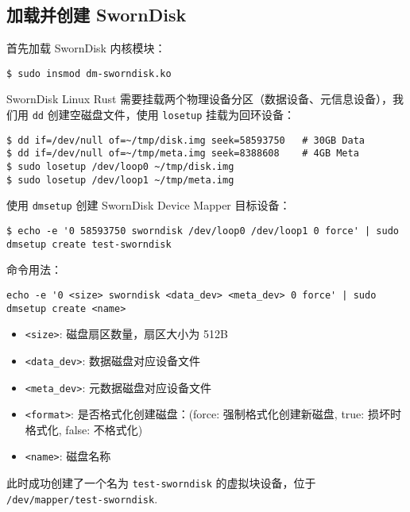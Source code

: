 \subsection{加载并创建 SwornDisk}

首先加载 SwornDisk 内核模块：

\begin{verbatim}
$ sudo insmod dm-sworndisk.ko
\end{verbatim}

SwornDisk Linux Rust 需要挂载两个物理设备分区（数据设备、元信息设备），我们用 \texttt{dd} 创建空磁盘文件，使用 \texttt{losetup} 挂载为回环设备：

\begin{verbatim}
$ dd if=/dev/null of=~/tmp/disk.img seek=58593750   # 30GB Data
$ dd if=/dev/null of=~/tmp/meta.img seek=8388608    # 4GB Meta
$ sudo losetup /dev/loop0 ~/tmp/disk.img
$ sudo losetup /dev/loop1 ~/tmp/meta.img
\end{verbatim}

使用 \texttt{dmsetup} 创建 SwornDisk Device Mapper 目标设备：

\begin{verbatim}
$ echo -e '0 58593750 sworndisk /dev/loop0 /dev/loop1 0 force' | sudo dmsetup create test-sworndisk
\end{verbatim}

命令用法：

\begin{verbatim}
echo -e '0 <size> sworndisk <data_dev> <meta_dev> 0 force' | sudo dmsetup create <name>
\end{verbatim}

\begin{itemize}[itemsep=2pt,topsep=0pt,parsep=0pt]
  \item \texttt{<size>}: 磁盘扇区数量，扇区大小为 512B
  \item \texttt{<data_dev>}: 数据磁盘对应设备文件
  \item \texttt{<meta_dev>}: 元数据磁盘对应设备文件
  \item \texttt{<format>}: 是否格式化创建磁盘：(force: 强制格式化创建新磁盘, true: 损坏时格式化, false: 不格式化)
  \item \texttt{<name>}: 磁盘名称
\end{itemize}

此时成功创建了一个名为 \texttt{test-sworndisk} 的虚拟块设备，位于 \texttt{/dev/mapper/test-sworndisk}.

